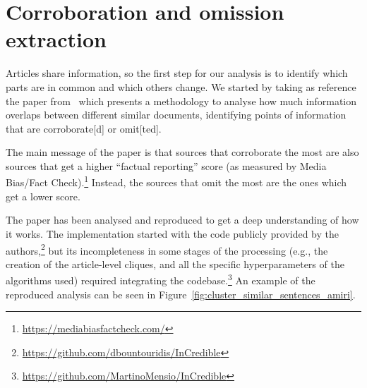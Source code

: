 


\section{Corroboration and omission extraction}
\label{sec:cgs_cross_referencing}
Articles share information, so the first step for our analysis is to identify which parts are in common and which others change.
We started by taking as reference the paper from~\citet{bountouridis2018explaining} which presents a methodology to analyse how much information overlaps between different similar documents, identifying points of information that are \gls{corroborate}[d] or \gls{omit}[ted].

The main message of the paper is that sources that \gls{corroborate} the most are also sources that get a higher ``factual reporting'' score (as measured by Media Bias/Fact Check).\footnote{\url{https://mediabiasfactcheck.com/}}
Instead, the sources that \gls{omit} the most are the ones which get a lower score.


The paper has been analysed and reproduced to get a deep understanding of how it works. The implementation started with the code publicly provided by the authors,\footnote{\url{https://github.com/dbountouridis/InCredible}} but its incompleteness in some stages of the processing (e.g., the creation of the article-level cliques, and all the specific hyperparameters of the algorithms used) required integrating the codebase.\footnote{\url{https://github.com/MartinoMensio/InCredible}}
An example of the reproduced analysis can be seen in Figure~\ref{fig:cluster_similar_sentences_amiri}.

